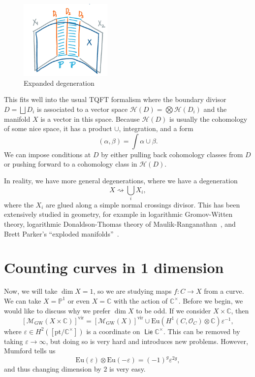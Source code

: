 \documentclass[leqno, openany]{memoir}
\theoremstyle{definition}
\theoremstyle{remark}
\theoremstyle{plain}
\theoremstyle{definition}
\theoremstyle{remark}
\newcommand{\C}{\mathbb{C}}
\renewcommand{\P}{\mathbb{P}}
\newcommand{\ep}{\varepsilon}
\newcommand{\mc}[1]{\mathcal{#1}}
\newcommand{\mr}[1]{\mathrm{#1}}
\newcommand{\ms}[1]{\mathsf{#1}}
\newcommand{\on}[1]{\operatorname{#1}}
\begin{document}
\begin{figure}[h]
    \centering
    \includegraphics[width=0.4\textwidth]{extdeg}
    \caption{Expanded degeneration}
    \label{fig:extdeg}
\end{figure}

This fits well into the usual TQFT formalism where the boundary divisor $D = \bigsqcup D_i$ is associated to a vector space $\mc{H}(D) = \bigotimes \mc{H}(D_i)$ and the manifold $X$ is a vector in this space. Because $\mc{H}(D)$ is usually the cohomology of some nice space, it has a product $\cup$, integration, and a form
\[ (\alpha, \beta) = \int \alpha \cup \beta. \]
We can impose conditions at $D$ by either pulling back cohomology classes from $D$ or pushing forward to a cohomology class in $\mc{H}(D)$.

In reality, we have more general degenerations, where we have a degeneration
\[ X \rightsquigarrow \bigcup_i X_i, \]
where the $X_i$ are glued along a simple normal crossings divisor. This has been extensively studied in geometry, for example in logarithmic Gromov-Witten theory, logarithmic Donaldson-Thomas theory of Maulik-Ranganathan~\cite{logdt}, and Brett Parker's ``exploded manifolds''~\cite{expman}.

\section{Counting curves in 1 dimension}

Now, we will take $\dim X = 1$, so we are studying maps $f \colon C \to X$ from a curve. We can take $X = \P^1$ or even $X = \C$ with the action of $\C^{\times}$. Before we begin, we would like to discuss why we prefer $\dim X$ to be odd. If we consider $X \times \C$, then
\[ [\mc{M}_{\mr{GW}}(X \times \C)]^{\mr{vir}} = [\mc{M}_{\mr{GW}}(X)]^{\mr{vir}} \cup \mr{Eu}(H^1(C, \mc{O}_C) \otimes \C) \ep^{-1}, \] 
where $\ep \in H^2([\mr{pt}/\C^{\times}])$ is a coordinate on $\on{\ms{Lie}} \C^{\times}$. This can be removed by taking $\ep \to \infty$, but doing so is very hard and introduces new problems. However, Mumford tells us
\[ \mr{Eu}(\ep) \otimes \mr{Eu}(-\ep) = (-1)^g \ep^{2g}, \]
and thus changing dimension by $2$ is very easy.
\end{document}
